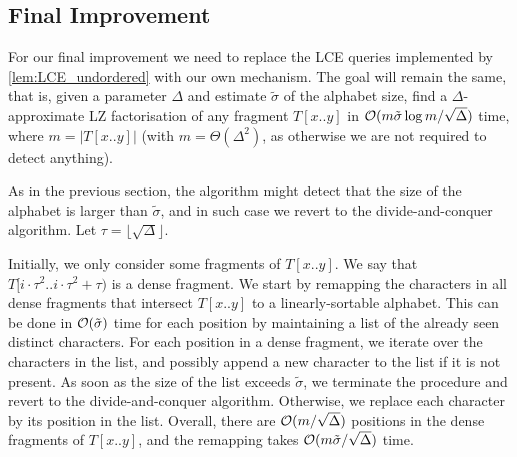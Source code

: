  
\subsection{Final Improvement}
\label{square:sec:finalimprov}


For our final improvement we need to replace the LCE queries implemented by \cref{lem:LCE_undordered} with our own
mechanism.
The goal will remain the same, that is, given a parameter $\Delta$ and estimate $\tilde{\sigma}$ of the alphabet size,
find a $\Delta$-approximate LZ factorisation of any fragment $T[x..y]$ in $\mathcal{O}(m\tilde{\sigma}\log m/\sqrt{\Delta})$ time, where $m=|T[x..y]|$ (with $m=\Theta(\Delta^2)$, as otherwise we are not required to detect anything).

As in the previous section, the algorithm might detect that the size of the alphabet is larger
than $\tilde{\sigma}$, and in such case we revert to the divide-and-conquer algorithm. Let $\tau=\lfloor\sqrt{\Delta}\rfloor$.

Initially, we only consider some fragments of $T[x..y]$. We say that $T[i\cdot \tau^{2}..i\cdot \tau^{2} + \tau)$ is a dense fragment.
We start by remapping the characters in all dense fragments that intersect $T[x..y]$ to a linearly-sortable alphabet. This can be done
in $\mathcal{O}(\tilde{\sigma})$ time for each position by maintaining a list of the already seen distinct characters. For each position in a dense fragment,
we iterate over the characters in the list, and possibly append a new character to the list if it is not present. As soon as the size of
the list exceeds $\tilde{\sigma}$, we terminate the procedure and revert to the divide-and-conquer algorithm. Otherwise, we replace each character by its position in the list.
Overall, there are $\mathcal{O}(m/\sqrt{\Delta})$ positions in the dense fragments of $T[x..y]$, and the remapping takes $\mathcal{O}(m\tilde{\sigma}/\sqrt{\Delta})$ time.

